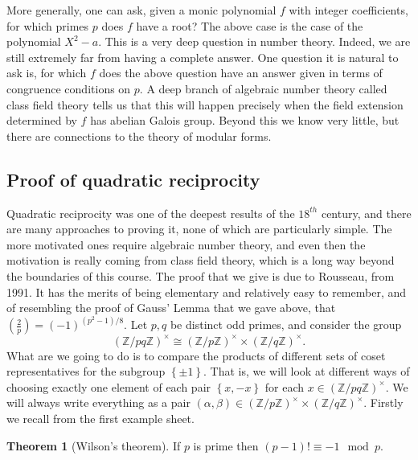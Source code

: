\documentclass{article}
\newcommand{\Z}{\mathbb{Z}}
\newcommand{\rb}[1]{\left( #1 \right)}
\newcommand{\cb}[1]{\left\{ #1 \right\}}
\newcommand{\unit}[1]{\rb{\Z / #1\Z}^\times}
\newcommand{\legendre}[2]{\rb{\tfrac{#1}{#2}}}
\theoremstyle{definition}\newtheorem{definition}{Definition}
\theoremstyle{definition}\newtheorem{remark}[definition]{Remark}
\theoremstyle{definition}\newtheorem*{example}{Example}
\theoremstyle{definition}\newtheorem*{note}{Note}
\newtheorem{theorem}[definition]{Theorem}
\begin{document}
More generally, one can ask, given a monic polynomial $ f $ with integer coefficients, for which primes $ p $ does $ f $ have a root? The above case is the case of the polynomial $ X^2 - a $. This is a very deep question in number theory. Indeed, we are still extremely far from having a complete answer. One question it is natural to ask is, for which $ f $ does the above question have an answer given in terms of congruence conditions on $ p $. A deep branch of algebraic number theory called class field theory tells us that this will happen precisely when the field extension determined by $ f $ has abelian Galois group. Beyond this we know very little, but there are connections to the theory of modular forms.


\subsection{Proof of quadratic reciprocity}

Quadratic reciprocity was one of the deepest results of the $ 18^{th} $ century, and there are many approaches to proving it, none of which are particularly simple. The more motivated ones require algebraic number theory, and even then the motivation is really coming from class field theory, which is a long way beyond the boundaries of this course. The proof that we give is due to Rousseau, from 1991. It has the merits of being elementary and relatively easy to remember, and of resembling the proof of Gauss' Lemma that we gave above, that $ \legendre{2}{p} = \rb{-1}^{\rb{p^2 - 1} / 8} $. Let $ p, q $ be distinct odd primes, and consider the group
$$ \unit{pq} \cong \unit{p} \times \unit{q}. $$
What are we going to do is to compare the products of different sets of coset representatives for the subgroup $ \cb{\pm 1} $. That is, we will look at different ways of choosing exactly one element of each pair $ \cb{x, -x} $ for each $ x \in \unit{pq} $. We will always write everything as a pair $ \rb{\alpha, \beta} \in \unit{p} \times \unit{q} $. Firstly we recall from the first example sheet.

\begin{theorem}[Wilson's theorem]
If $ p $ is prime then $ \rb{p - 1}! \equiv -1 \mod p $.
\end{theorem}
\end{document}
